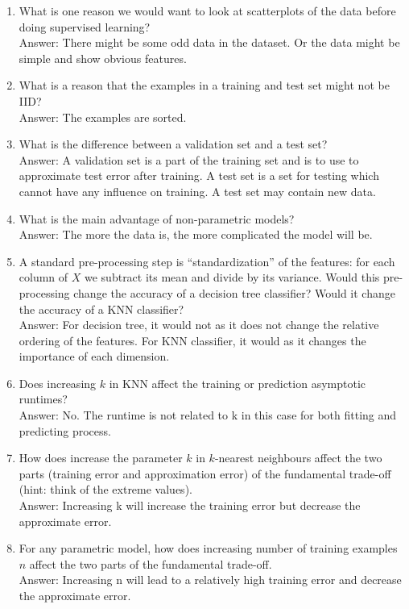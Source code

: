 \documentclass{article}
\def\enum#1{\begin{enumerate}#1\end{enumerate}}
\begin{document}
\enum{
\item What is one reason we would want to look at scatterplots of the data before doing supervised learning?
\textcolor{gre}{\\Answer: There might be some odd data in the dataset. Or the data might be simple and show obvious features.}
\item What is a reason that the examples in a training and test set might not be IID?
\textcolor{gre}{\\Answer: The examples are sorted. }
\item What is the difference between a validation set and a test set?
\textcolor{gre}{\\Answer: A validation set is a part of the training set and is to use to approximate test error after training. A test set is a set for testing which cannot have any influence on training. A test set may contain new data. }
\item What is the main advantage of non-parametric models?
\textcolor{gre}{\\Answer: The more the data is, the more complicated the model will be. }
\item A standard pre-processing step is ``standardization'' of the features: for each column of $X$ we subtract its mean and divide by its variance. Would this pre-processing change the accuracy of a decision tree classifier? Would it change the accuracy of a KNN classifier?
\textcolor{gre}{\\Answer: For decision tree, it would not as it does not change the relative ordering of the features. For KNN classifier, it would as it changes the importance of each dimension. }
\item Does increasing $k$ in KNN affect the training or prediction asymptotic runtimes?
\textcolor{gre}{\\Answer: No. The runtime is not related to k in this case for both fitting and predicting process. }
\item How does increase the parameter $k$ in $k$-nearest neighbours affect the two parts (training error and approximation error) of the fundamental trade-off (hint: think of the extreme values).
\textcolor{gre}{\\Answer: Increasing k will increase the training error but decrease the approximate error. }
\item For any parametric model, how does increasing number of training examples $n$ affect the two parts of the fundamental trade-off.
\textcolor{gre}{\\Answer: Increasing n will lead to a relatively high training error and decrease the approximate error. }
}
\end{document}
